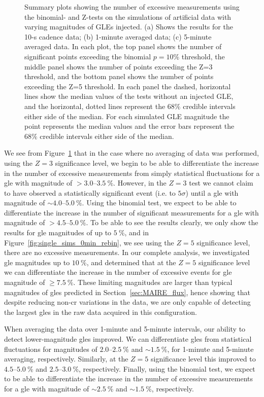 \begin{figure}[!htbp!]
	\caption{Summary plots showing the number of excessive measurements using the binomial- and Z-tests on the simulations of artificial data with varying magnitudes of GLEs injected. (a) Shows the results for the 10-s cadence data; (b) 1-minute averaged data; (c) 5-minute averaged data. In each plot, the top panel shows the number of significant points exceeding the binomial $p = 10 \%$ threshold, the middle panel shows the number of points exceeding the Z=3 threshold, and the bottom panel shows the number of points exceeding the Z=5 threshold. In each panel the dashed, horizontal lines show the median values of the tests without an injected GLE, and the horizontal, dotted lines represent the $68 \%$ credible intervals either side of the median. For each simulated GLE magnitude the point represents the median values and the error bars represent the $68 \%$ credible intervals either side of the median.}
	\label{fig:single_HS14008_sims}
\end{figure}

We see from Figure~\ref{fig:single_HS14008_sims} that in the case where no averaging of data was performed, using the $Z=3$ significance level, we begin to be able to differentiate the increase in the number of excessive measurements from simply statistical fluctuations for a \gls{gle} with magnitude of $>3.0$--$3.5~\%$. However, in the $Z=3$ test we cannot claim to have observed a statistically significant event (i.e. to $5\sigma$) until a \gls{gle} with magnitude of $\sim$$4.0$--$5.0~\%$. Using the binomial test, we expect to be able to differentiate the increase in the number of significant measurements for a \gls{gle} with magnitude of $>4.5$--$5.0~\%$. To be able to see the results clearly, we only show the results for \gls{gle} magnitudes of up to $5~\%$, and in Figure~\ref{fig:single_sims_0min_rebin}, we see using the $Z=5$ significance level, there are no excessive measurements. In our complete analysis, we investigated \gls{gle} magnitudes up to $10~\%$, and determined that at the $Z=5$ significance level we can differentiate the increase in the number of excessive events for \gls{gle} magnitude of $\geq7.5~\%$. These limiting magnitudes are larger than typical magnitudes of \glspl{gle} predicted in Section~\ref{sec:MAIRE_flux}, hence showing that despite reducing non-\gls{cr} variations in the data, we are only capable of detecting the largest \glspl{gle} in the raw data acquired in this configuration.

When averaging the data over 1-minute and 5-minute intervals, our ability to detect lower-magnitude \glspl{gle} improved. We can differentiate \glspl{gle} from statistical fluctuations for magnitudes of $2.0$--$2.5~\%$ and $\sim1.5~\%$, for 1-minute and 5-minute averaging, respectively. Similarly, at the $Z=5$ significance level this improved to $4.5$--$5.0~\%$ and $2.5$--$3.0~\%$, respectively. Finally, using the binomial test, we expect to be able to differentiate the increase in the number of excessive measurements for a \gls{gle} with magnitude of $\sim2.5~\%$ and $\sim1.5~\%$, respectively.

